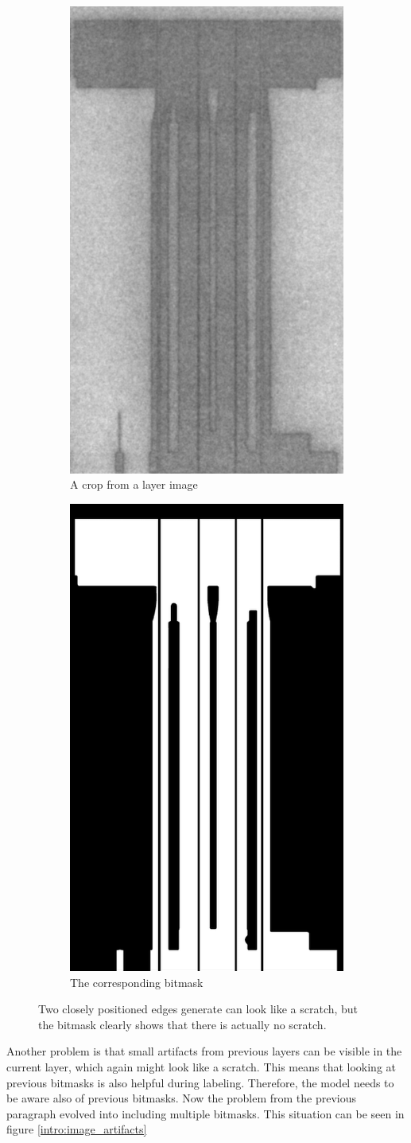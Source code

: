 \begin{figure}[!h]
\centering
\begin{subfigure}{.5\textwidth}
  \centering
  \includegraphics[width=.4\linewidth]{images/introduction/bitmask_integration/layer_00091}
  \caption{A crop from a layer image}
\end{subfigure}%
\begin{subfigure}{.5\textwidth}
  \centering
  \includegraphics[width=.4\linewidth]{images/introduction/bitmask_integration/bitmask_00091}
  \caption{The corresponding bitmask}
\end{subfigure}
\caption{Two closely positioned edges generate can look like a scratch, but the bitmask clearly shows that there is actually no scratch.}
\label{intro:double_edge}
\end{figure}

Another problem is that small artifacts from previous layers can be visible in the current layer, which again might look like a scratch. This means that looking at previous bitmasks is also helpful during labeling. Therefore, the model needs to be aware also of previous bitmasks. Now the problem from the previous paragraph evolved into including multiple bitmasks. This situation can be seen in figure \ref{intro:image_artifacts} \\

